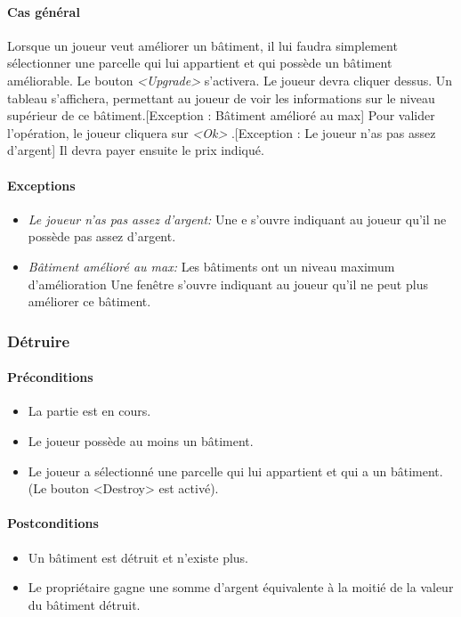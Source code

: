 \documentclass[a4paper,11pt]{report}
\begin{document}
\paragraph{Cas général}
Lorsque un joueur veut améliorer un bâtiment, il lui faudra simplement sélectionner une parcelle qui lui appartient et qui possède un bâtiment améliorable. Le bouton \og \textit{<Upgrade>} \fg s'activera. Le joueur devra cliquer dessus. Un tableau s'affichera, permettant au joueur de voir les informations sur le niveau supérieur de ce bâtiment.[Exception : Bâtiment amélioré au max] Pour valider l'opération, le joueur cliquera sur \og \textit{<Ok>} \fg.[Exception : Le joueur n'as pas assez d'argent] Il devra payer ensuite le prix indiqué.
\paragraph{Exceptions}
\begin{itemize}
 \item \textit{Le joueur n'as pas assez d'argent:}  Une e s'ouvre indiquant au joueur qu'il ne possède pas assez d'argent.
 \item \textit{Bâtiment amélioré au max:}  Les bâtiments ont un niveau maximum d'amélioration Une fenêtre s'ouvre indiquant au joueur qu'il ne peut plus améliorer ce bâtiment.
\end{itemize}
\subsubsection{Détruire}
\paragraph{Préconditions}
\begin{itemize}
 \item La partie est en cours.
 \item Le joueur possède au moins un bâtiment.
 \item Le joueur a sélectionné une parcelle qui lui appartient et qui a un bâtiment. (Le bouton <Destroy> est activé).
\end{itemize}
\paragraph{Postconditions}
\begin{itemize}
 \item Un bâtiment est détruit et n’existe plus.
 \item Le propriétaire gagne une somme d'argent équivalente à la moitié de la valeur du bâtiment détruit.
\end{itemize}
\end{document}
